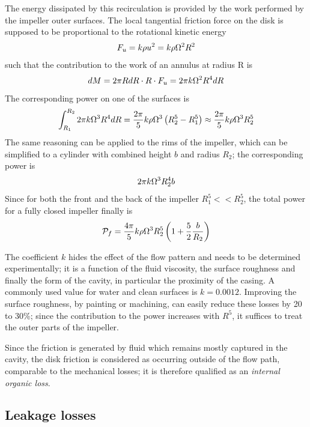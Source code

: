 The energy dissipated by this recirculation is provided by the work
performed by the impeller outer surfaces. The local tangential
friction force on the disk is supposed to be proportional to the
rotational kinetic energy
\begin{align*}
  F_u = k \rho u^2 = k \rho \Omega^2 R^2
\end{align*}
such that the contribution to the work of an annulus at radius R is 
\begin{align*}
  d M = 2 \pi R dR \cdot R \cdot F_u = 2 \pi k \Omega^2 R^4 dR
\end{align*}
The corresponding power on one of the surfaces is
\begin{align*}
  \int_{R_1}^{R_2} 2 \pi k \Omega^3 R^4 dR = \frac{2 \pi}{5} k \rho
  \Omega^3 \left(R_2^5 - R_1^5\right) \approx \frac{2 \pi}{5} k \rho
  \Omega^3 R_2^5
\end{align*}
The same reasoning can be applied to the rims of the impeller, which
can be simplified to a cylinder with combined height $b$ and radius
$R_2$; the corresponding power is
\begin{align*}
  2 \pi k \Omega^3 R_2^4 b
\end{align*}
Since for both the front and the back of the impeller $R_1^5 <<
R_2^5$, the total power for a fully closed impeller finally is
\begin{equation}
  \mathcal P_f = 
  \frac{4 \pi}{5} k \rho \Omega^3 R_2^5 
  \left(1+\frac{5}{2} \frac{b}{R_2}\right)
\end{equation}

The coefficient $k$ hides the effect of the flow pattern and needs to
be determined experimentally; it is a function of the fluid viscosity,
the surface roughness and finally the form of the cavity, in
particular the proximity of the casing. A commonly used value for
water and clean surfaces is $k=0.0012$. Improving the surface
roughness, \eg by painting or machining, can easily reduce these
losses by 20 to 30\%; since the contribution to the power increases
with $R^5$, it suffices to treat the outer parts of the impeller.

Since the friction is generated by fluid which remains mostly captured
in the cavity, the disk friction is considered as occurring outside of
the flow path, comparable to the mechanical losses; it is therefore
qualified as an \emph{internal organic loss}.

\subsection{Leakage losses}

